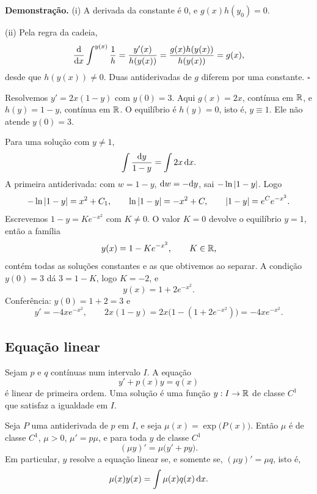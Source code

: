 \documentclass[11pt,a4paper]{article}
\begin{document}
\noindent\textbf{Demonstração.}
(i) A derivada da constante é \(0\), e \(g(x)h(y_{0})=0\).

(ii) Pela regra da cadeia,
\[
\frac{\mathrm{d}}{\mathrm{d} x}\int^{y(x)}\frac{1}{h}
=\frac{y'(x)}{h(y(x))}
=\frac{g(x)h(y(x))}{h(y(x))}
=g(x),
\]
desde que \(h(y(x))\neq 0\). Duas antiderivadas de \(g\) diferem por uma constante.
\hfill\(\square\)


\begin{exemplo}
Resolvemos \(y'=2x(1-y)\) com \(y(0)=3\). Aqui \(g(x)=2x\), contínua em \(\mathbb{R}\), e \(h(y)=1-y\), contínua em \(\mathbb{R}\). O equilíbrio é \(h(y)=0\), isto é, \(y\equiv 1\). Ele não atende \(y(0)=3\).

Para uma solução com \(y\neq 1\),
\[
\int\frac{\mathrm{d} y}{1-y}=\int 2x\,\mathrm{d} x.
\]
A primeira antiderivada: com \(w=1-y\), \(\mathrm{d} w=-\mathrm{d} y\), sai \(-\ln\left\lvert 1-y \right\rvert\). Logo
\[
-\ln\left\lvert 1-y \right\rvert=x^{2}+C_{1},\qquad
\ln\left\lvert 1-y \right\rvert=-x^{2}+C,\qquad
\left\lvert 1-y \right\rvert=e^{C}e^{-x^{2}}.
\]
Escrevemos \(1-y=Ke^{-x^{2}}\) com \(K\neq 0\). O valor \(K=0\) devolve o equilíbrio \(y=1\), então a família
\[
y(x)=1-Ke^{-x^{2}},\qquad K\in\mathbb{R},
\]
contém todas as soluções constantes e as que obtivemos ao separar. A condição \(y(0)=3\) dá \(3=1-K\), logo \(K=-2\), e
\[
y(x)=1+2e^{-x^{2}}.
\]
Conferência: \(y(0)=1+2=3\) e
\[
y'=-4xe^{-x^{2}},\qquad
2x(1-y)=2x\bigl(1-(1+2e^{-x^{2}})\bigr)=-4xe^{-x^{2}}.
\]
\end{exemplo}

\subsection{Equação linear}

\begin{definicao}
Sejam \(p\) e \(q\) contínuas num intervalo \(I\). A equação
\[
y'+p(x)y=q(x)
\]
é linear de primeira ordem. Uma solução é uma função \(y:I\to\mathbb{R}\) de classe \(C^1\) que satisfaz a igualdade em \(I\).
\end{definicao}

\begin{teorema}
Seja \(P\) uma antiderivada de \(p\) em \(I\), e seja \(\mu(x)=\exp\bigl(P(x)\bigr)\). Então \(\mu\) é de classe \(C^1\), \(\mu>0\), \(\mu'=p\mu\), e para toda \(y\) de classe \(C^1\)
\[
(\mu y)'=\mu\bigl(y'+p y\bigr).
\]
Em particular, \(y\) resolve a equação linear se, e somente se, \((\mu y)'=\mu q\), isto é,
\[
\mu(x)y(x)=\int\mu(x)q(x)\,\mathrm{d} x.
\]
\end{teorema}
\end{document}
